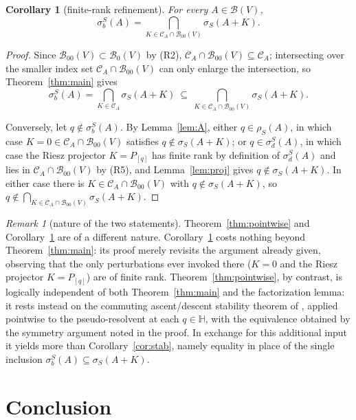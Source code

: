 \documentclass[11pt,a4paper]{article}
\theoremstyle{plain}
\newtheorem{corollary}{Corollary}[section]
\theoremstyle{remark}
\newtheorem{remark}{Remark}[section]
\newcommand{\HH}{\mathbb H}
\newcommand{\V}{V}
\newcommand{\B}{\mathcal B}
\newcommand{\Bo}{\mathcal B_0}
\newcommand{\Boo}{\mathcal B_{00}}
\newcommand{\CA}{\mathcal C_A}
\newcommand{\sS}{\sigma_S}
\newcommand{\sigb}{\sigma_b^S}
\newcommand{\sd}{\sigma_d^S}
\newcommand{\rS}{\rho_S}
\begin{document}
\begin{corollary}[finite-rank refinement]\label{cor:finite}
For every $A\in\B(\V)$,
\[
\sigb(A)=\bigcap_{K\in\CA\cap\Boo(\V)}\sS(A+K).
\]
\end{corollary}

\begin{proof}
Since $\Boo(\V)\subset\Bo(\V)$ by (R2), $\CA\cap\Boo(\V)\subseteq\CA$; intersecting over the smaller index set $\CA\cap\Boo(\V)$ can only enlarge the intersection, so Theorem~\ref{thm:main} gives
\[
\sigb(A)=\bigcap_{K\in\CA}\sS(A+K)\ \subseteq\ \bigcap_{K\in\CA\cap\Boo(\V)}\sS(A+K).
\]

Conversely, let $q\notin\sigb(A)$. By Lemma~\ref{lem:A}, either $q\in\rS(A)$, in which case $K=0\in\CA\cap\Boo(\V)$ satisfies $q\notin\sS(A+K)$; or $q\in\sd(A)$, in which case the Riesz projector $K=P_{[q]}$ has finite rank by definition of $\sd(A)$ and lies in $\CA\cap\Boo(\V)$ by (R5), and Lemma~\ref{lem:proj} gives $q\notin\sS(A+K)$. In either case there is $K\in\CA\cap\Boo(\V)$ with $q\notin\sS(A+K)$, so $q\notin\bigcap_{K\in\CA\cap\Boo(\V)}\sS(A+K)$.
\end{proof}

\begin{remark}[nature of the two statements]\label{rem:corollaries}
Theorem~\ref{thm:pointwise} and Corollary~\ref{cor:finite} are of a different nature. Corollary~\ref{cor:finite} costs nothing beyond Theorem~\ref{thm:main}: its proof merely revisits the argument already given, observing that the only perturbations ever invoked there ($K=0$ and the Riesz projector $K=P_{[q]}$) are of finite rank. Theorem~\ref{thm:pointwise}, by contrast, is logically independent of both Theorem~\ref{thm:main} and the factorization lemma: it rests instead on the commuting ascent/descent stability theorem of \cite{KD24}, applied pointwise to the pseudo-resolvent at each $q\in\HH$, with the equivalence obtained by the symmetry argument noted in the proof. In exchange for this additional input it yields more than Corollary~\ref{cor:stab}, namely equality in place of the single inclusion $\sigb(A)\subseteq\sS(A+K)$.
\end{remark}

\section{Conclusion}\label{sec:conclusion}
 
\end{document}
